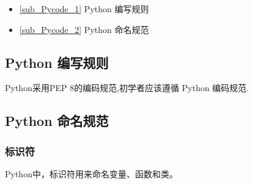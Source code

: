 
\begin{itemize}
\item \autoref{sub_Pycode_1} Python 编写规则
\item \autoref{sub_Pycode_2} Python 命名规范
\end{itemize}

\subsection{Python 编写规则}\label{sub_Pycode_1}

Python采用PEP 8的编码规范,初学者应该遵循 Python 编码规范.

\subsection{Python 命名规范}\label{sub_Pycode_2}
\subsubsection{标识符}
Python中，标识符用来命名变量、函数和类。


